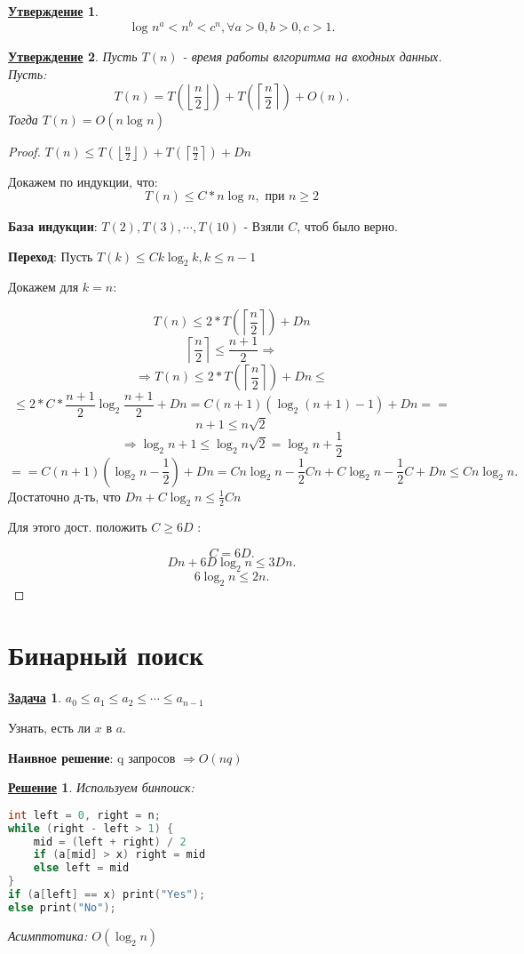 \documentclass[12pt]{article}
\newcommand{\floor}[1]{\left\lfloor #1 \right\rfloor}
\newcommand{\ceil}[1]{\left\lceil #1 \right\rceil}
\newtheorem{statement}{\underline{Утверждение}}[section]
\newtheorem*{solution}{\underline{Решение}}
\theoremstyle{definition}
\theoremstyle{definition}
\newtheorem{task}{\underline{Задача}}[section]
\begin{document}
\begin{statement}
\[
\log_{}{n}^{a} < n^{b} < c^{n}, \forall a > 0, b > 0, c > 1
.\] 
\end{statement}
\begin{statement}
Пусть $T(n)$ - время работы влгоритма на входных данных. Пусть:
\[
T(n) = T(\floor{\frac{n}{2}}) + T(\ceil{\frac{n}{2}}) + O(n)
.\] 
Тогда $T(n) = O(n\log_{}{n})$
\end{statement}
\begin{proof}
$T(n) \leq T(\floor{\frac{n}{2}}) + T(\ceil{\frac{n}{2}}) + Dn$ 

Докажем по индукции, что:
\[
    T(n) \leq C * n\log_{}{n}, \text{ при } n \geq 2
\]

\textbf{База индукции}: $T(2), T(3), \cdots, T(10)$ - Взяли $C$, чтоб было верно.

\textbf{Переход}: Пусть $T(k) \leq Ck\log_{2}{k}, k \leq n - 1$ 

Докажем для $k = n$:

\[
T(n) \leq 2 * T(\ceil{\frac{n}{2}}) + Dn
\] 
\[
\ceil{\frac{n}{2}} \leq \frac{n + 1}{2} \Rightarrow
\] 
\[
\Rightarrow T(n) \leq 2 * T(\ceil{\frac{n}{2}}) + Dn \leq
\] 
\[
\leq 2 * C * \frac{n + 1}{2} \log_{2}{\frac{n + 1}{2}} + Dn = C(n + 1)(\log_{2}{(n + 1)} - 1) + Dn ==
\] 
\[
n + 1 \leq n\sqrt{2}
\] 
\[
\Rightarrow \log_{2}{n + 1} \leq \log_{2}{n\sqrt{2}} = \log_{2}{n} + \frac{1}{2}
\] 
\[
== C(n + 1)(\log_{2}{n} - \frac{1}{2}) + Dn = Cn\log_{2}{n} - \frac{1}{2}Cn + C\log_{2}{n} - \frac{1}{2}C + Dn \leq Cn\log_{2}{n}
.\] 
Достаточно д-ть, что $Dn + C\log_{2}{n} \leq \frac{1}{2}Cn$

Для этого дост. положить $C \geq 6D$ :

 \[
 C = 6D
 .\] 
 \[
 Dn + 6D\log_{2}{n} \leq 3Dn
 .\] 
 \[
 6\log_{2}{n} \leq 2n
 .\] 
\end{proof}

\section{Бинарный поиск}
\begin{task}
$a_0 \leq a_1 \leq a_2 \leq \cdots \leq a_{n - 1}$
 
Узнать, есть ли $x$ в $a$.

\textbf{Наивное решение}: q запросов $\Rightarrow O(nq)$
\end{task}

\begin{solution}
Используем бинпоиск:
\lstset{style=mystyle}
\begin{lstlisting}[language=C++, caption=Binary Search]
int left = 0, right = n;
while (right - left > 1) {
    mid = (left + right) / 2 
    if (a[mid] > x) right = mid
    else left = mid
}
if (a[left] == x) print("Yes");
else print("No");
\end{lstlisting}
Асимптотика: $O(\log_{2}{n})$
\end{solution}
\end{document}
